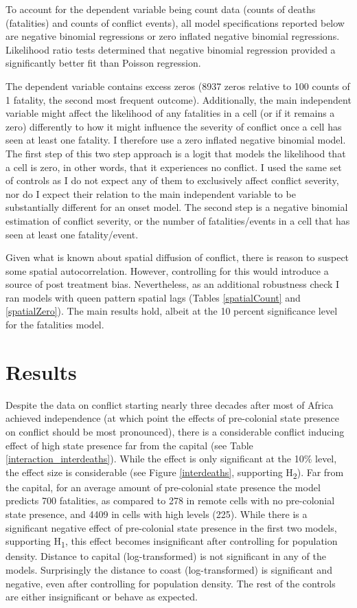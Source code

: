 \documentclass[12pt]{article}
\begin{document}
To account for the dependent variable being count data (counts of deaths
(fatalities) and counts of conflict events), all model specifications reported
below are negative binomial regressions or zero inflated negative binomial
regressions. Likelihood ratio tests determined that negative binomial regression
provided a significantly better fit than Poisson regression.

The dependent variable contains excess zeros (8937 zeros relative to 100 counts
of 1 fatality, the second most frequent outcome). Additionally, the main
independent variable might affect the likelihood of any fatalities in a cell (or
if it remains a zero) differently to how it might influence the severity of
conflict once a cell has seen at least one fatality. I therefore use a zero
inflated negative binomial model. The first step of this two step approach is a
logit that models the likelihood that a cell is zero, in other words, that it
experiences no conflict. I used the same set of controls as I do not expect any
of them to exclusively affect conflict severity, nor do I expect their relation
to the main independent variable to be substantially different for an onset
model. The second step is a negative binomial estimation of conflict severity,
or the number of fatalities/events in a cell that has seen at least one
fatality/event.

Given what is known about spatial diffusion of conflict, there is reason to
suspect some spatial autocorrelation. However, controlling for this would
introduce a source of post treatment bias. Nevertheless, as an additional
robustness check I ran models with queen pattern spatial lags (Tables
\ref{spatialCount} and \ref{spatialZero}). The main results hold, albeit at the
10 percent significance level for the fatalities model.

\section{Results} \label{Results}

Despite the data on conflict starting nearly three decades after most of Africa
achieved independence (at which point the effects of pre-colonial state presence
on conflict should be most pronounced), there is a considerable conflict
inducing effect of high state presence far from the capital (see Table
\ref{interaction_interdeaths}). While the effect is only significant at the 10\%
level, the effect size is considerable (see Figure \ref{interdeaths}, supporting
H\textsubscript{2}). Far from the capital, for an average amount of pre-colonial state
presence the model predicts 700 fatalities, as compared to 278 in remote cells
with no pre-colonial state presence, and 4409 in cells with high levels (225).
While there is a significant negative effect of pre-colonial state presence in
the first two models, supporting H\textsubscript{1}, this effect becomes
insignificant after controlling for population density. Distance to capital
(log-transformed) is not significant in any of the models. Surprisingly the
distance to coast (log-transformed) is significant and negative, even after
controlling for population density. The rest of the controls are either
insignificant or behave as expected.
\end{document}
